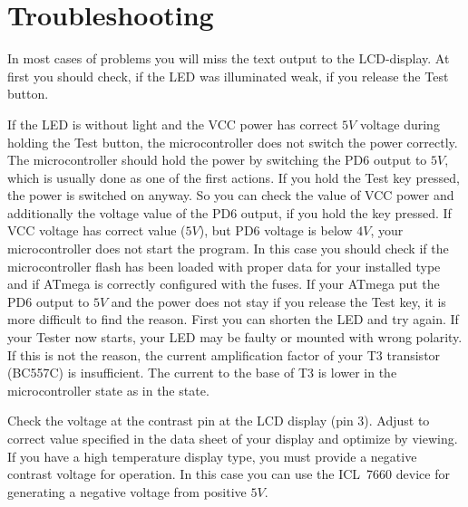 \section{Troubleshooting}
In most cases of problems you will miss the text output to the LCD-display.
At first you should check, if the LED was illuminated weak, if you release
the Test button. 
\begin{description} \setlength{\itemsep}{0em}

\item[Power does not switch on.]
If the LED is without light and the VCC power has correct
\(5V\) voltage during holding the Test button, the microcontroller does not switch the power
correctly. The microcontroller should hold the power by switching the
PD6 output to \(5V\), which is usually done as one of the first actions.
If you hold the Test key pressed, the power is switched on anyway.
So you can check the value of VCC power and additionally the voltage value
of the PD6 output, if you hold the key pressed.
If VCC voltage has correct value (\(5V\)), but PD6 voltage is
below \(4V\), your microcontroller does not start the program. In this case
you should check if the microcontroller flash has been loaded with proper data for your
installed type and if ATmega is correctly configured with the fuses.
If your ATmega put the PD6 output to \(5V\) and the power does not stay if you
release the Test key, it is more difficult to find the reason.
First you can shorten the LED and try again. If your Tester now starts,
your LED may be faulty or mounted with wrong polarity. If this is not
the reason, the current amplification factor of your T3 transistor (BC557C)
is insufficient. The current to the base of T3 is lower in the microcontroller
state as in the  state.

\item[Nothing is readable on the LCD display]
Check the voltage at the contrast pin at the LCD display (pin 3). Adjust to
correct value specified in the data sheet of your display and optimize by viewing.
If you have a high temperature display type, you must provide a negative contrast voltage
for operation. In this case you can use the ICL~7660 device for generating
a negative voltage from positive \(5V\).


\end{description}
